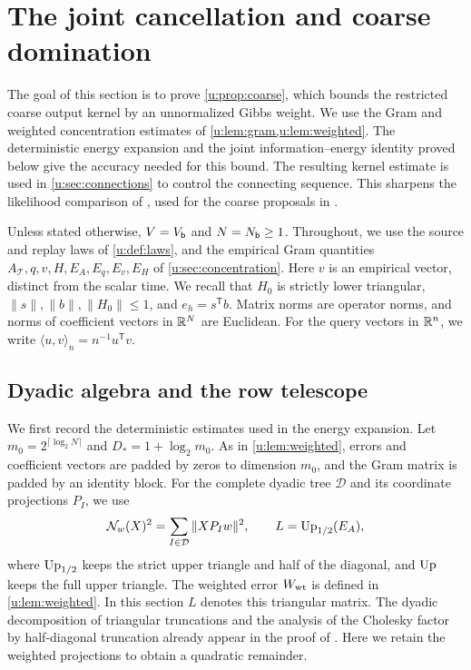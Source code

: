 \chapter{The joint cancellation and coarse domination}\label{u:sec:coarse}

The goal of this section is to prove \cref{u:prop:coarse}, which bounds the restricted coarse output kernel by an unnormalized Gibbs weight. We use the Gram and weighted concentration estimates of \cref{u:lem:gram,u:lem:weighted}. The deterministic energy expansion and the joint information--energy identity proved below give the accuracy needed for this bound. The resulting kernel estimate is used in \cref{u:sec:connections} to control the connecting sequence. This sharpens the likelihood comparison of \cite[Section~4, Proposition~5, equation~(6)]{oai-typical-upper}, used for the coarse proposals in \cite[Section~6, proof of Proposition~7]{oai-typical-upper}.

Unless stated otherwise, $V=V_{\mathsf{b}}$ and $N=N_{\mathsf{b}}\ge1$. Throughout, we use the source and replay laws of \cref{u:def:laws}, and the empirical Gram quantities $A_{\mathcal T},q,v,H,E_A,E_q,E_v,E_H$ of \cref{u:sec:concentration}. Here $v$ is an empirical vector, distinct from the scalar time. We recall that $H_0$ is strictly lower triangular, $\|s\|,\|b\|,\|H_0\|\le1$, and $e_h=s^{\mathsf T}b$. Matrix norms are operator norms, and norms of coefficient vectors in $\mathbb R^N$ are Euclidean. For the query vectors in $\mathbb R^n$, we write $\langle u,v\rangle_n=n^{-1}u^{\mathsf T}v$.

\section{Dyadic algebra and the row telescope}\label{u:sec:dyadic}

We first record the deterministic estimates used in the energy expansion. Let $m_0=2^{\lceil\log_2N\rceil}$ and $D_*=1+\log_2m_0$. As in \cref{u:lem:weighted}, errors and coefficient vectors are padded by zeros to dimension $m_0$, and the Gram matrix is padded by an identity block. For the complete dyadic tree $\mathcal D$ and its coordinate projections $P_I$, we use
\[
 \mathcal N_w(X)^2=\sum_{I\in\mathcal D}\|XP_Iw\|^2,
 \qquad L=\operatorname{Up}_{1/2}(E_A),
\]
where $\operatorname{Up}_{1/2}$ keeps the strict upper triangle and half of the diagonal, and $\operatorname{Up}$ keeps the full upper triangle. The weighted error $W_{\rm wt}$ is defined in \cref{u:lem:weighted}. In this section $L$ denotes this triangular matrix. The dyadic decomposition of triangular truncations and the analysis of the Cholesky factor by half-diagonal truncation already appear in the proof of \cite[Section~4, Proposition~5]{oai-typical-upper}. Here we retain the weighted projections to obtain a quadratic remainder.

